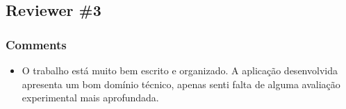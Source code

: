 \documentclass[12pt]{article}
\begin{document}
\subsection{Reviewer \#3}

\subsubsection{Comments}

\begin{itemize}
\item O trabalho está muito bem escrito e organizado. A aplicação desenvolvida apresenta um bom domínio técnico, apenas senti falta de alguma avaliação experimental mais aprofundada.

\end{itemize}
\end{document}
